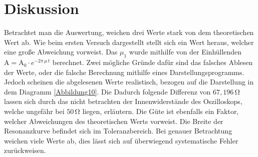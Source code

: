 \section{Diskussion}

\begin{flushleft}
    Betrachtet man die Auswertung, weichen drei Werte stark von dem theoretischen Wert ab. 
    Wie beim ersten Versuch dargestellt stellt sich ein Wert heraus, welcher eine große Abweichung vorweist.
    Das $\mu_{1}$ wurde mithilfe von der Einhüllenden $\text{A}= \text{A}_{0} \cdot e^{-2\pi\,\mu\,t}$ berechnet.
    Zwei mögliche Gründe dafür sind das falsches Ablesen der Werte, oder die falsche Berechnung mithilfe eines Darstellungsprogramms. 
    Jedoch scheinen die abgelesenen Werte realistisch, bezogen auf die Darstellung in dem Diagramm \ref{Abbildung10}.
    Die Dadurch folgende Differenz von $ 67,196\,\unit{\ohm} $ lassen sich durch das nicht betrachten der Innenwiderstände des Oszilloskops, welche ungefähr bei $50\, \unit{\ohm}$ \cite{rohde} liegen, erläutern.
    Die Güte ist ebenfalls ein Faktor, welcher Abweichungen des theoretischen Werts vorweist. Die Breite der Resonanzkurve befindet sich im Toleranzbereich. 
    Bei genauer Betrachtung weichen viele Werte ab, dies lässt sich auf überwiegend systematische Fehler zurückweisen.
\end{flushleft}